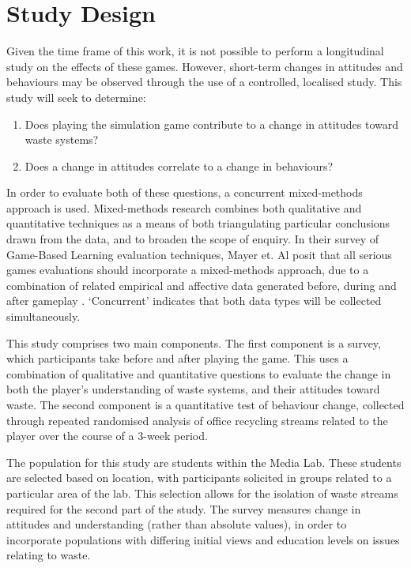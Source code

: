\documentclass[nofonts,nols,justified,nobib]{tufte-book}
\begin{document}
\newpage

\section*{Study Design}

Given the time frame of this work, it is not possible to perform a longitudinal study on the effects of these games. However, short-term changes in attitudes and behaviours may be observed through the use of a controlled, localised study. This study will seek to determine:
\begin{enumerate}
\item Does playing the simulation game contribute to a change in attitudes toward waste systems?
\item Does a change in attitudes correlate to a change in behaviours?
\end{enumerate}

In order to evaluate both of these questions, a concurrent mixed-methods approach is used. Mixed-methods research combines both qualitative and quantitative techniques as a means of both triangulating particular conclusions drawn from the data, and to broaden the scope of enquiry. In their survey of Game-Based Learning evaluation techniques, Mayer et. Al posit that all serious games evaluations should incorporate a mixed-methods approach, due to a combination of related empirical and affective data generated before, during and after gameplay \cite{mayer_research_2014}. `Concurrent' indicates that both data types will be collected simultaneously.

This study comprises two main components. The first component is a survey, which participants take before and after playing the game. This uses a combination of qualitative and quantitative questions to evaluate the change in both the player's understanding of waste systems, and their attitudes toward waste. The second component is a quantitative test of behaviour change, collected through repeated randomised analysis of office recycling streams related to the player over the course of a 3-week period.

The population for this study are students within the Media Lab. These students are selected based on location, with participants solicited in groups related to a particular area of the lab. This selection allows for the isolation of waste streams required for the second part of the study. The survey measures change in attitudes and understanding (rather than absolute values), in order to incorporate populations with differing initial views and education levels on issues relating to waste.
\end{document}
